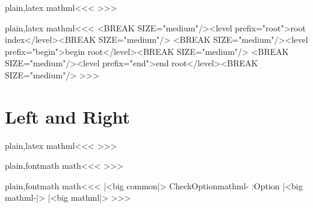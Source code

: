 {\<plain,latex mathml\><<<
    {}
    {}
    {}
>>>


\<plain,latex mathml\><<<
   {<BREAK SIZE="medium"/><level prefix="root">root
         index</level><BREAK SIZE="medium"/>}
   {<BREAK SIZE="medium"/><level prefix="begin">begin
         root</level><BREAK SIZE="medium"/>}
   {<BREAK SIZE="medium"/><level prefix="end">end
         root</level><BREAK SIZE="medium"/>}
>>>





\section{Left and Right}


\<plain,latex mathml\><<<
   {}
   {\bgroup
    \bgroup}
   {\egroup{}\egroup
           }
   {}
>>>




\<plain,fontmath math\><<<
   {}{}
   {}
   {}
   {}{}
   {}
   {}
   {}{}
   {}
   {}
   {}{}
   {}
   {}
>>>







\<plain,fontmath math\><<<
|<big common|>
\:CheckOption{mathml-}     \if:Option 
   |<big mathml-|>
\else
   |<big mathml|>
\fi
>>>

}
